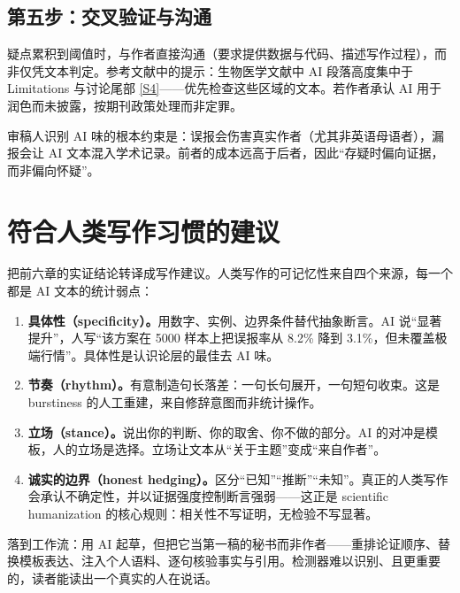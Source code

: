 \documentclass[10pt,a4paper]{ctexart}
\begin{document}
\begin{justifying}
\subsection{第五步：交叉验证与沟通}

疑点累积到阈值时，与作者直接沟通（要求提供数据与代码、描述写作过程），而非仅凭文本判定。参考文献中的提示：生物医学文献中 AI 段落高度集中于 Limitations 与讨论尾部 \href{https://www.richardshelab.com/fine-grained-detection-biorxiv.pdf}{[S4]}——优先检查这些区域的文本。若作者承认 AI 用于润色而未披露，按期刊政策处理而非定罪。

审稿人识别 AI 味的根本约束是：误报会伤害真实作者（尤其非英语母语者），漏报会让 AI 文本混入学术记录。前者的成本远高于后者，因此“存疑时偏向证据，而非偏向怀疑”。

\end{justifying}

\section{符合人类写作习惯的建议}

\begin{justifying}
把前六章的实证结论转译成写作建议。人类写作的可记忆性来自四个来源，每一个都是 AI 文本的统计弱点：

\begin{enumerate}[leftmargin=2em,itemsep=2pt]
\item \textbf{具体性（specificity）。}用数字、实例、边界条件替代抽象断言。AI 说“显著提升”，人写“该方案在 5000 样本上把误报率从 8.2\% 降到 3.1\%，但未覆盖极端行情”。具体性是认识论层的最佳去 AI 味。
\item \textbf{节奏（rhythm）。}有意制造句长落差：一句长句展开，一句短句收束。这是 burstiness 的人工重建，来自修辞意图而非统计操作。
\item \textbf{立场（stance）。}说出你的判断、你的取舍、你不做的部分。AI 的对冲是模板，人的立场是选择。立场让文本从“关于主题”变成“来自作者”。
\item \textbf{诚实的边界（honest hedging）。}区分“已知”“推断”“未知”。真正的人类写作会承认不确定性，并以证据强度控制断言强弱——这正是 scientific humanization 的核心规则：相关性不写证明，无检验不写显著。
\end{enumerate}

落到工作流：用 AI 起草，但把它当第一稿的秘书而非作者——重排论证顺序、替换模板表达、注入个人语料、逐句核验事实与引用。检测器难以识别、且更重要的，读者能读出一个真实的人在说话。

\end{justifying}
\end{document}
